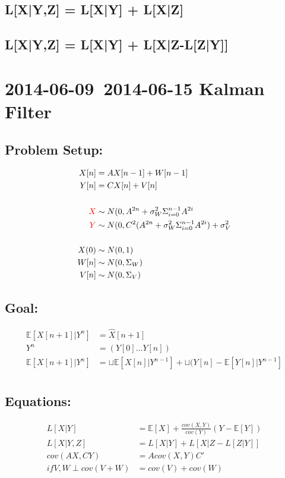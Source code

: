 \documentclass[leqno,twocolumn]{article}
\begin{document}
\subsection{L[X|Y,Z] = L[X|Y] + L[X|Z]}

\subsection{L[X|Y,Z] = L[X|Y] + L[X|Z-L[Z|Y]]}

\section{2014-06-09~2014-06-15 Kalman Filter}
\subsection{Problem Setup:}
\begin{align*}
X[n] &= AX[n-1]+W[n-1]\\
Y[n] &= CX[n]+V[n]\\
\\
\textcolor{red}{X} &\sim N(0, A^{2n} + \sigma_W^2\Sigma_{i=0}^{n-1}A^{2i}\\
\textcolor{red}{Y} &\sim N(0, C^2(A^{2n} + \sigma_W^2\Sigma_{i=0}^{n-1}A^{2i}) + \sigma_V^2\\
\\
X(0) &\sim N(0,1)\\
W[n] &\sim N(0,\Sigma_W)\\
V[n] &\sim N(0,\Sigma_V)
\end{align*}

\subsection{Goal:}
\begin{align*}
\mathbb{E}[X[n+1]|Y^n] &= \hat{X}[n+1]\\
Y^n &= (Y[0] \dots Y[n])\\
\mathbb{E}[X[n+1]|Y^n] &= \sqcup\mathbb{E}[X[n]|Y^{n-1}] + \sqcup(Y[n] - \mathbb{E}[Y[n]|Y^{n-1}]  \\
\end{align*}

\subsection{Equations:}
\begin{align}
L[X|Y] &= \mathbb{E}[X] + \frac{cov(X,Y)}{cov(Y)}(Y-\mathbb{E}[Y])\\
L[X|Y,Z] &= L[X|Y] + L[X|Z-L[Z|Y]]\\
cov(AX,CY) &= Acov(X,Y)C'\\
if V,W \perp cov(V+W) &= cov(V) + cov(W)
\end{align}
\end{document}
